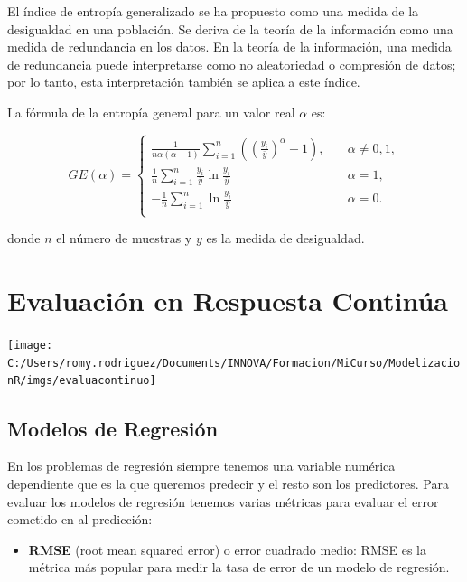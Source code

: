 \documentclass[]{book}
\providecommand{\tightlist}{%
  \setlength{\itemsep}{0pt}\setlength{\parskip}{0pt}}
\begin{document}
El índice de entropía generalizado se ha propuesto como una medida de la desigualdad en una población. Se deriva de la teoría de la información como una medida de redundancia en los datos. En la teoría de la información, una medida de redundancia puede interpretarse como no aleatoriedad o compresión de datos; por lo tanto, esta interpretación también se aplica a este índice.

La fórmula de la entropía general para un valor real \(\alpha\) es:

\[GE(\alpha) = \begin{cases}
       \frac{1}{n\alpha (\alpha -1)} \sum_{i=1}^{n} \left(\left( \frac{y_i}{\bar{y}} \right) ^{\alpha} -1\right), &\quad \alpha\neq0,1 ,\\
       \frac{1}{n} \sum_{i=1}^{n} \frac{y_i}{\bar{y}} \ln \frac{y_i}{\bar{y}} &\quad \alpha = 1 ,\\
       -\frac{1}{n} \sum_{i=1}^{n} \ln \frac{y_i}{\bar{y}} &\quad \alpha = 0 .\\
     \end{cases}\]

donde \(n\) el número de muestras y \(y\) es la medida de desigualdad.

\hypertarget{evaluacion-en-respuesta-continua}{%
\section{Evaluación en Respuesta Continúa}\label{evaluacion-en-respuesta-continua}}

\texttt{[image: C:/Users/romy.rodriguez/Documents/INNOVA/Formacion/MiCurso/ModelizacionR/imgs/evaluacontinuo]}

\hypertarget{modelos-de-regresion}{%
\subsection{Modelos de Regresión}\label{modelos-de-regresion}}

En los problemas de regresión siempre tenemos una variable numérica dependiente que es la que queremos predecir y el resto son los predictores. Para evaluar los modelos de regresión tenemos varias métricas para evaluar el error cometido en al predicción:

\begin{itemize}
\tightlist
\item
  \textbf{RMSE} (root mean squared error) o error cuadrado medio: RMSE es la métrica más popular para medir la tasa de error de un modelo de regresión.
\end{itemize}
\end{document}
